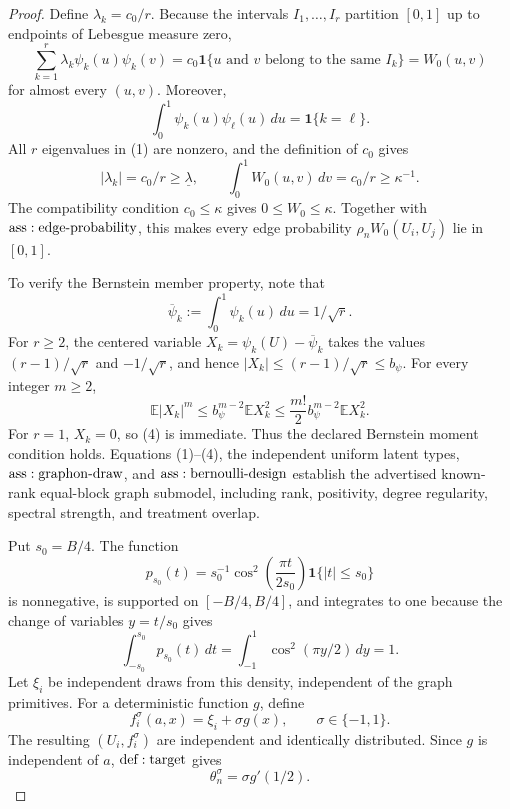 \documentclass{article}
\begin{document}
\begin{proof}
Define \(\lambda_k=c_0/r\).  Because the intervals \(I_1,\ldots,I_r\) partition \([0,1]\) up to endpoints of Lebesgue measure zero,
\[
 \sum_{k=1}^r\lambda_k\psi_k(u)\psi_k(v)
 =c_0\mathbf1\{u\text{ and }v\text{ belong to the same }I_k\}
 =W_0(u,v)
\tag{1}
\]
for almost every \((u,v)\).  Moreover,
\[
 \int_0^1\psi_k(u)\psi_\ell(u)\,du=\mathbf1\{k=\ell\}.
\tag{2}
\]
All \(r\) eigenvalues in (1) are nonzero, and the definition of \(c_0\) gives
\[
 |\lambda_k|=c_0/r\geq\underline\lambda,\qquad
 \int_0^1W_0(u,v)\,dv=c_0/r\geq\kappa^{-1}.
\tag{3}
\]
The compatibility condition \(c_0\leq\kappa\) gives \(0\leq W_0\leq\kappa\).  Together with \({\rm ass:edge\text{-}probability}\), this makes every edge probability \(\rho_nW_0(U_i,U_j)\) lie in \([0,1]\).

To verify the Bernstein member property, note that
\[
 \overline\psi_k:=\int_0^1\psi_k(u)\,du=1/\sqrt r.
\]
For \(r\geq2\), the centered variable \(X_k=\psi_k(U)-\overline\psi_k\) takes the values \((r-1)/\sqrt r\) and \(-1/\sqrt r\), and hence \(|X_k|\leq(r-1)/\sqrt r\leq b_\psi\).  For every integer \(m\geq2\),
\[
 \mathbb E|X_k|^m
 \leq b_\psi^{m-2}\mathbb EX_k^2
 \leq\frac{m!}{2}b_\psi^{m-2}\mathbb EX_k^2.
\tag{4}
\]
For \(r=1\), \(X_k=0\), so (4) is immediate.  Thus the declared Bernstein moment condition holds.  Equations (1)--(4), the independent uniform latent types, \({\rm ass:graphon\text{-}draw}\), and \({\rm ass:bernoulli\text{-}design}\) establish the advertised known-rank equal-block graph submodel, including rank, positivity, degree regularity, spectral strength, and treatment overlap.

Put \(s_0=B/4\).  The function
\[
 p_{s_0}(t)=s_0^{-1}\cos^2\!\left(\frac{\pi t}{2s_0}\right)
 \mathbf1\{|t|\leq s_0\}
\tag{5}
\]
is nonnegative, is supported on \([-B/4,B/4]\), and integrates to one because the change of variables \(y=t/s_0\) gives
\[
 \int_{-s_0}^{s_0}p_{s_0}(t)\,dt
 =\int_{-1}^{1}\cos^2(\pi y/2)\,dy=1.
\tag{6}
\]
Let \(\xi_i\) be independent draws from this density, independent of the graph primitives.  For a deterministic function \(g\), define
\[
 f_i^\sigma(a,x)=\xi_i+\sigma g(x),\qquad \sigma\in\{-1,1\}.
\tag{7}
\]
The resulting \((U_i,f_i^\sigma)\) are independent and identically distributed.  Since \(g\) is independent of \(a\), \({\rm def:target}\) gives
\[
 \theta_n^\sigma=\sigma g'(1/2).
\tag{8}
\]


\end{proof}
\end{document}
